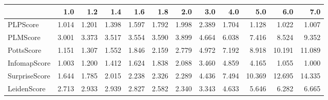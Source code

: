 \begin{tabular}{lrrrrrrrrrrr}
\toprule
{} &   1.0 &   1.2 &   1.4 &   1.6 &   1.8 &   2.0 &   3.0 &   4.0 &    5.0 &    6.0 &    7.0 \\
\midrule
PLPScore      & 1.014 & 1.201 & 1.398 & 1.597 & 1.792 & 1.998 & 2.389 & 1.704 &  1.128 &  1.022 &  1.007 \\
PLMScore      & 3.001 & 3.373 & 3.517 & 3.554 & 3.590 & 3.899 & 4.664 & 6.038 &  7.416 &  8.524 &  9.352 \\
PottsScore    & 1.151 & 1.307 & 1.552 & 1.846 & 2.159 & 2.779 & 4.972 & 7.192 &  8.918 & 10.191 & 11.089 \\
InfomapScore  & 1.003 & 1.200 & 1.412 & 1.624 & 1.838 & 2.088 & 3.460 & 4.859 &  4.165 &  1.055 &  1.000 \\
SurpriseScore & 1.644 & 1.785 & 2.015 & 2.238 & 2.326 & 2.289 & 4.436 & 7.494 & 10.369 & 12.695 & 14.335 \\
LeidenScore   & 2.713 & 2.933 & 2.939 & 2.827 & 2.582 & 2.340 & 3.343 & 4.633 &  5.646 &  6.282 &  6.665 \\
\bottomrule
\end{tabular}

